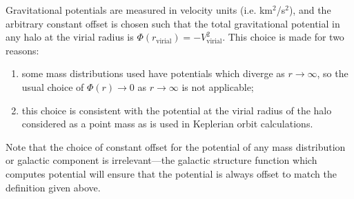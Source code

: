 Gravitational potentials are measured in velocity units (i.e. km$^2$/s$^2$), and the arbitrary constant offset is chosen such that the total gravitational potential in any halo at the virial radius is $\Phi(r_\mathrm{virial})=-V_\mathrm{virial}^2$. This choice is made for two reasons:
\begin{enumerate}
\item some mass distributions used have potentials which diverge as $r\rightarrow\infty$, so the usual choice of $\Phi(r) \rightarrow 0$ as $r \rightarrow \infty$ is not applicable;
\item this choice is consistent with the potential at the virial radius of the halo considered as a point mass as is used in Keplerian orbit calculations.
\end{enumerate}
Note that the choice of constant offset for the potential of any mass distribution or galactic component is irrelevant---the galactic structure function which computes potential will ensure that the potential is always offset to match the definition given above.
